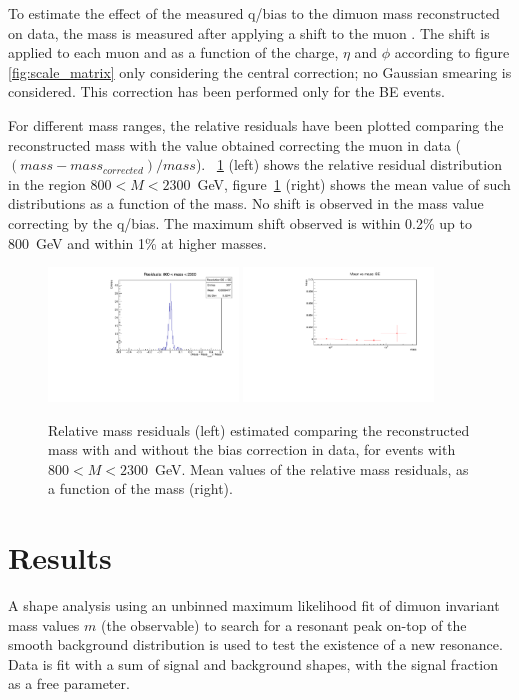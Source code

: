 To estimate the effect of the measured q/\pt bias to the dimuon mass reconstructed on data, the mass is measured after applying a shift to the muon \pt. The shift is applied to each muon and as a function of the charge, $\eta$ and $\phi$ according to figure \ref{fig:scale_matrix} only considering the central correction; no Gaussian smearing is considered.
This correction has been performed only for the BE events.

For different mass ranges, the relative residuals have been plotted comparing the reconstructed mass with the value obtained correcting the muon \pt in data ($(mass - mass_{corrected})/mass$). \figurename~\ref{fig:MeanScaleData} (left) shows the relative residual distribution in the region $800 < M < 2300$~GeV, figure~\ref{fig:MeanScaleData} (right)  shows the mean value of such distributions as a function of the mass. No shift is observed in the mass value correcting by the q/\pt bias. The maximum shift observed is within 0.2\% up to 800~GeV and within 1\% at higher masses. 

\begin{figure}[htbp]
\centering
\includegraphics[width=0.45\textwidth]{Images/Cap5/BE_Data_residuals_Scale_lastMassBin.pdf}
\includegraphics[width=0.45\textwidth]{Images/Cap5/Mean_vs_mass_global_BE.pdf}
\caption{Relative mass residuals (left) estimated comparing the reconstructed mass with and without the \pt bias correction in data, for events with  $800 < M < 2300$~GeV. Mean values of the relative mass residuals, as a function of the mass (right).}
\label{fig:MeanScaleData}
\end{figure}

\section{Results}
A shape analysis using an unbinned maximum likelihood fit of dimuon invariant mass values $m$ (the observable) to search for a resonant peak on-top of the smooth background distribution is used to test the existence of a new resonance. Data is fit with a sum of signal and background shapes, with the signal fraction as a free parameter.

